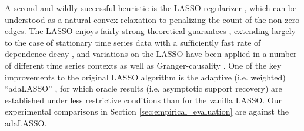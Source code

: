 \documentclass[12pt]{article}
\begin{document}
A second and wildly successful heuristic is the LASSO regularizer
\cite{tibshirani1996regression}, which can be understood as a natural
convex relaxation to penalizing the count of the non-zero edges.  The
LASSO enjoys fairly strong theoretical guarantees
\cite{wainwright2009sharp}, extending largely to the case of
stationary time series data with a sufficiently fast rate of
dependence decay \cite{basu2015} \cite{wong2016lasso}
\cite{autoregressive_process_modelling_via_the_lasso_procedure}, and
variations on the LASSO have been applied in a number of different
time series contexts as well as Granger-causality
\cite{DBLP:journals/corr/HallacPBL17} \cite{haufe2008sparse}
\cite{bolstad2011causal} \cite{he2013stationary}
\cite{grouped_graphical_granger_modelling_for_gene_expression_regulatory_networks_discovery}.
One of the key improvements to the original LASSO algorithm is the
adaptive (i.e. weighted) ``adaLASSO'' \cite{adaptive_lasso_zou2006},
for which oracle results (i.e. asymptotic support recovery) are
established under less restrictive conditions than for the vanilla
LASSO.  Our experimental comparisons in Section
\ref{sec:empirical_evaluation} are against the
adaLASSO. %

\end{document}
